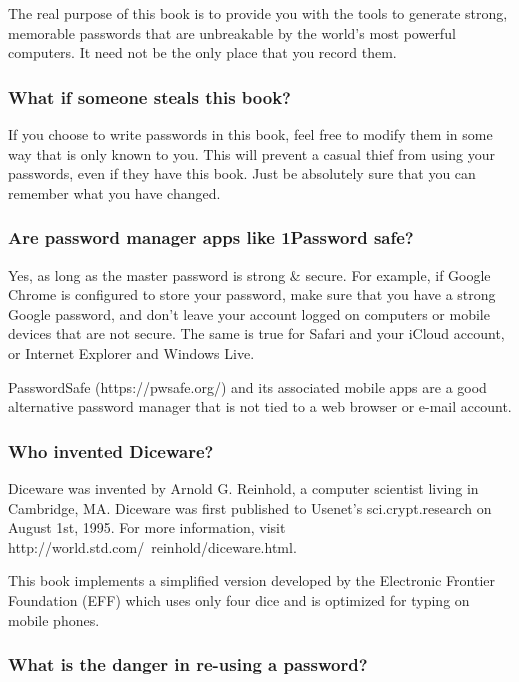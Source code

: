 The real purpose of this book is to provide you with the tools to generate strong, memorable passwords that are unbreakable by the world's most powerful computers. It need not be the only place that you record them.

\subsubsection{What if someone steals this book?}

If you choose to write passwords in this book, feel free to modify them in some way that is only known to you. This will prevent a casual thief from using your passwords, even if they have this book. Just be absolutely sure that you can remember what you have changed.

\subsubsection{Are password manager apps like 1Password safe?}

Yes, as long as the master password is strong \& secure. For example, if Google Chrome is configured to store your password, make sure that you have a strong Google password, and don't leave your account logged on computers or mobile devices that are not secure. The same is true for Safari and your iCloud account, or Internet Explorer and Windows Live.

PasswordSafe (https://pwsafe.org/) and its associated mobile apps are a good alternative password manager that is not tied to a web browser or e-mail account.

\subsubsection{Who invented Diceware?}

Diceware was invented by Arnold G. Reinhold, a computer scientist living in Cambridge, MA. Diceware was first published to Usenet's sci.crypt.research on August 1st, 1995. For more information, visit http://world.std.com/~reinhold/diceware.html. 

This book implements a simplified version developed by the Electronic Frontier Foundation (EFF) which uses only four dice and is optimized for typing on mobile phones.
 
\subsubsection{What is the danger in re-using a password?}

